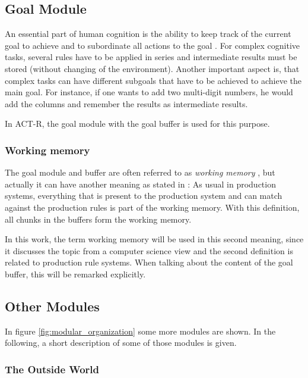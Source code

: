\subsection{Goal Module}

An essential part of human cognition is the ability to keep track of the current goal to achieve and to subordinate all actions to the goal \cite[p. 1041]{anderson_integrated_2004}. For complex cognitive tasks, several rules have to be applied in series and intermediate results must be stored (without changing of the environment). Another important aspect is, that complex tasks can have different subgoals that have to be achieved to achieve the main goal. For instance, if one wants to add two multi-digit numbers, he would add the columns and remember the results as intermediate results.

In ACT-R, the goal module with the goal buffer is used for this purpose. 

\subsubsection{Working memory}

The goal module and buffer are often referred to as \emph{working memory} \cite[p. 1041]{anderson_integrated_2004}, but actually it can have another meaning as stated in \cite{anderson_working_1996}: As usual in production systems, everything that is present to the production system and can match against the production rules is part of the working memory. With this definition, all chunks in the buffers form the working memory.

In this work, the term working memory will be used in this second meaning, since it discusses the topic from a computer science view and the second definition is related to production rule systems. When talking about the content of the goal buffer, this will be remarked explicitly.

\subsection{Other Modules}

In figure \ref{fig:modular_organization} some more modules are shown. In the following, a short description of some of those modules is given.

\subsubsection{The Outside World}


